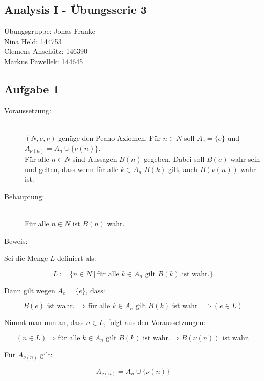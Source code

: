 \documentclass[11pt, a4paper]{article}
\begin{document}
	\begin{center} \section*{Analysis I - Übungsserie 3} \end{center}

	Übungsgruppe: Jonas Franke \\


	Nina Held: 144753 \\
	Clemens Anschütz: 146390 \\
	Markus Pawellek: 144645 \\


	\subsection*{Aufgabe 1}

		\begin{description}
			\item[Voraussetzung:] \hfill \\
				$(N,e,\nu)$ genüge den Peano Axiomen. Für $n \in N$ soll $A_e = \{e\}$ und $A_{\nu(n)} = A_n \cup \{\nu(n)\}$. \\
				Für alle $n \in N$ sind Aussagen $B(n)$ gegeben. Dabei soll $B(e)$ wahr sein und gelten, dass wenn für alle $k \in A_n$  $B(k)$ gilt, auch $B(\nu(n))$ wahr ist. \hfill 
			\item[Behauptung:] \hfill \\
				Für alle $n \in N$ ist $B(n)$ wahr. \hfill 
			\item[Beweis:] 
		\end{description}

		Sei die Menge $L$ definiert als:

		\[ L := \{ n \in N \ | \ \text{für alle } k \in A_n \text{ gilt } B(k) \text{ ist wahr.} \} \]

		Dann gilt wegen $A_e = \{e\}$, dass:

		\[ B(e) \text{ ist wahr. } \Rightarrow \text{für alle } k \in A_e \text{ gilt } B(k) \text{ ist wahr. } \Rightarrow (e \in L) \]

		Nimmt man nun an, dass $n \in L$, folgt aus den Voraussetzungen:

		\[ (n \in L) \Rightarrow \text{für alle } k \in A_n \text{ gilt } B(k) \text{ ist wahr.} \Rightarrow B(\nu(n)) \text{ ist wahr.} \]

		Für $A_{\nu(n)}$ gilt:

		\[ A_{\nu(n)} = A_n \cup \{\nu(n)\} \]
\end{document}
